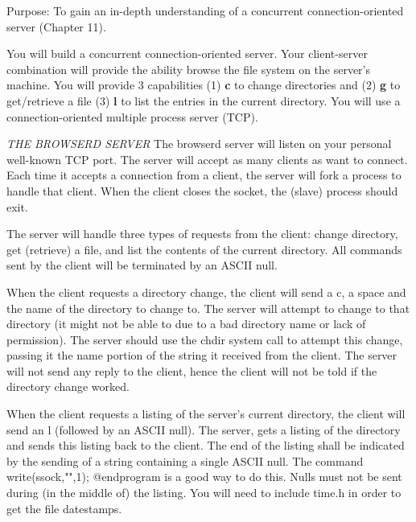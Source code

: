 

\parindent 0pt

Purpose: To gain an in-depth understanding of
a concurrent connection-oriented server (Chapter 11).

You will build a concurrent connection-oriented server.
Your client-server combination will provide the ability browse
the file system on the server's machine.
You will provide 3 capabilities 
(1) {\bf c} to change directories and
(2) {\bf g} to get/retrieve a file
(3) {\bf l} to list the entries in the current directory.
You will use a connection-oriented multiple process server (TCP).

{\it THE BROWSERD SERVER}
\hfill\break
The {\ltt{}browserd} server will listen on your personal well-known TCP port.
The server will accept as many clients as want to connect.
Each time it accepts a connection from a client,
the server will fork a process to handle that client. 
When the client closes the socket, the (slave) process should exit.

The server will handle three types of requests from the client:
change directory,
get (retrieve) a file,
and list the contents of the current directory.
All commands sent by the client will be terminated by an ASCII null.

When the client requests a directory change,
the client will send a c, a space and the name of the directory
to change to.
The server will attempt to change to that directory (it might not be able
to due to a bad directory name or lack of permission).
The server should use the {\ltt{}chdir} system call to attempt this change,
passing it the name portion of the string it received from the client.
The server will not send any reply to the client,
hence the client will not be told if the directory change worked.

When the client requests a listing of the server's current directory,
the client will send an l (followed by an ASCII null).
The server, gets a listing of the directory and sends this listing
back to the client.
The end of the listing shall be indicated by the sending of a string
containing a single ASCII null.
The command
{\cprogram
write(ssock,"\0",1);
@endprogram} 
is a good way to do this.
Nulls must not be sent during (in the middle of) the listing. 
You will need to include time.h in order to get the file datestamps.


